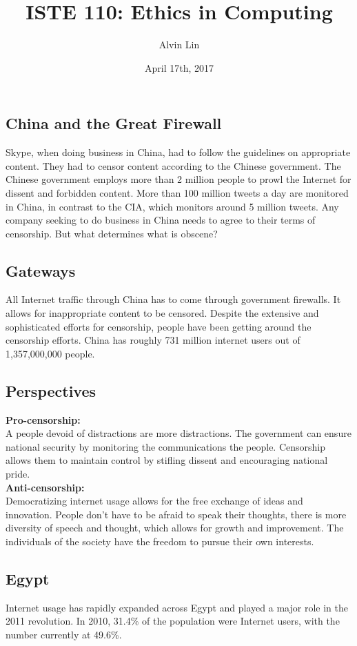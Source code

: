 \documentclass[letterpaper, 12pt]{article}
\title{ISTE 110: Ethics in Computing}
\author{Alvin Lin}
\date{April 17th, 2017}
\begin{document}
\maketitle

\subsection*{China and the Great Firewall}
Skype, when doing business in China, had to follow the guidelines on
appropriate content. They had to censor content according to the Chinese
government. The Chinese government employs more than 2 million people to
prowl the Internet for dissent and forbidden content. More than 100 million
tweets a day are monitored in China, in contrast to the CIA, which monitors
around 5 million tweets. Any company seeking to do business in China needs to
agree to their terms of censorship. But what determines what is obscene?

\subsection*{Gateways}
All Internet traffic through China has to come through government firewalls.
It allows for inappropriate content to be censored. Despite the extensive
and sophisticated efforts for censorship, people have been getting around
the censorship efforts. China has roughly 731 million internet users out of
1,357,000,000 people.

\subsection*{Perspectives}
\textbf{Pro-censorship:} \\
A people devoid of distractions are more distractions. The government can ensure
national security by monitoring the communications the people. Censorship
allows them to maintain control by stifling dissent and encouraging national
pride. \\
\textbf{Anti-censorship:} \\
Democratizing internet usage allows for the free exchange of ideas and
innovation. People don't have to be afraid to speak their thoughts, there is
more diversity of speech and thought, which allows for growth and improvement.
The individuals of the society have the freedom to pursue their own interests.

\subsection*{Egypt}
Internet usage has rapidly expanded across Egypt and played a major role in
the 2011 revolution. In 2010, 31.4\% of the population were Internet users,
with the number currently at 49.6\%.
\end{document}
